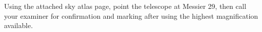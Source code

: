 Using the attached sky atlas page, point the telescope at Messier 29, then
call your examiner for confirmation and marking after using the highest
magnification available.

